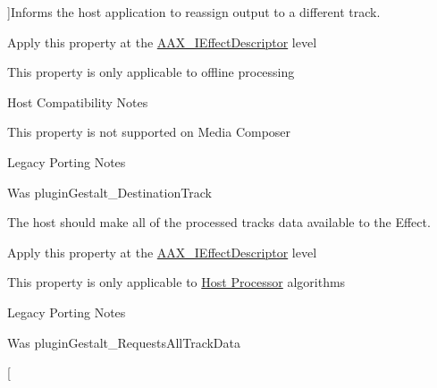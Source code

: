 \begin{Desc}
\begin{description}
{}]Informs the host application to reassign output to a different track. \begin{DoxyItemize}
\item Apply this property at the \hyperlink{a00096}{A\+A\+X\+\_\+\+I\+Effect\+Descriptor} level \item This property is only applicable to offline processing\end{DoxyItemize}
\begin{DoxyRefDesc}{Host Compatibility Notes}
\item[\hyperlink{a00380__compatibility_notes000066}{Host Compatibility Notes}]This property is not supported on Media Composer\end{DoxyRefDesc}


\begin{DoxyRefDesc}{Legacy Porting Notes}
\item[\hyperlink{a00384__porting_notes000051}{Legacy Porting Notes}]Was plugin\+Gestalt\+\_\+\+Destination\+Track \end{DoxyRefDesc}
\item[{\em 
\hypertarget{a00283_a6571f4e41a5dd06e4067249228e2249eaa59caaf3d7c3e195a32b8cb09a9baac2}{}A\+A\+X\+\_\+e\+Property\+\_\+\+Requests\+All\+Track\+Data\label{a00283_a6571f4e41a5dd06e4067249228e2249eaa59caaf3d7c3e195a32b8cb09a9baac2}
}]The host should make all of the processed track\textquotesingle{}s data available to the Effect. \begin{DoxyItemize}
\item Apply this property at the \hyperlink{a00096}{A\+A\+X\+\_\+\+I\+Effect\+Descriptor} level \item This property is only applicable to \hyperlink{a00334}{Host Processor} algorithms\end{DoxyItemize}
\begin{DoxyRefDesc}{Legacy Porting Notes}
\item[\hyperlink{a00384__porting_notes000052}{Legacy Porting Notes}]Was plugin\+Gestalt\+\_\+\+Requests\+All\+Track\+Data \end{DoxyRefDesc}
\item[{\em 
}
\end{description}
\end{Desc}
